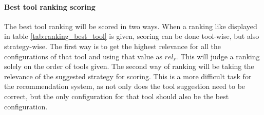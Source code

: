\paragraph{Best tool ranking scoring} The best tool ranking will be scored in two ways. When a ranking like displayed in table \ref{tab:ranking_best_tool} is given, scoring can be done tool-wise, but also strategy-wise. The first way is to get the highest relevance for all the configurations of that tool and using that value as $rel_r$. This will judge a ranking solely on the order of tools given. The second way of ranking will be taking the relevance of the suggested strategy for scoring. This is a more difficult task for the recommendation system, as not only does the tool suggestion need to be correct, but the only configuration for that tool should also be the best configuration. 